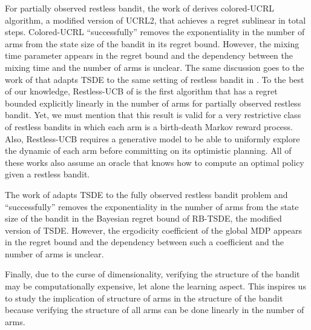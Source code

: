 For partially observed restless bandit, the work of \cite{ortner2012regret} derives colored-UCRL algorithm, a modified version of UCRL2, that achieves a regret sublinear in total steps.
Colored-UCRL ``successfully'' removes the exponentiality in the number of arms from the state size of the bandit in its regret bound.
However, the mixing time parameter appears in the regret bound and the dependency between the mixing time and the number of arms is unclear.
The same discussion goes to the work of \cite{jung2019thompson} that adapts TSDE to the same setting of restless bandit in \cite{ortner2012regret}.
To the best of our knowledge, Restless-UCB of \cite{wang2020restless} is the first algorithm that has a regret bounded explicitly linearly in the number of arms for partially observed restless bandit.
Yet, we must mention that this result is valid for a very restrictive class of restless bandits in which each arm is a birth-death Markov reward process.
Also, Restless-UCB requires a generative model to be able to uniformly explore the dynamic of each arm before committing on its optimistic planning.
All of these works also assume an oracle that knows how to compute an optimal policy given a restless bandit.

The work of \cite{akbarzadeh2022learning} adapts TSDE to the fully observed restless bandit problem and ``successfully'' removes the exponentiality in the number of arms from the state size of the bandit in the Bayesian regret bound of RB-TSDE, the modified version of TSDE.
However, the ergodicity coefficient of the global MDP appears in the regret bound and the dependency between such a coefficient and the number of arms is unclear.

Finally, due to the curse of dimensionality, verifying the structure of the bandit may be computationally expensive, let alone the learning aspect.
This inspires us to study the implication of structure of arms in the structure of the bandit because verifying the structure of all arms can be done linearly in the number of arms.




